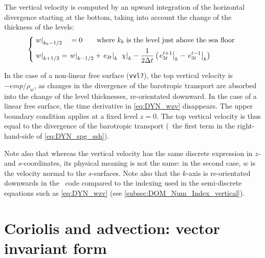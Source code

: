 \documentclass[../main/NEMO_manual]{subfiles}
\begin{document}
The vertical velocity is computed by an upward integration of the horizontal divergence starting at the bottom,
taking into account the change of the thickness of the levels:
\begin{equation}
  \label{eq:DYN_wzv}
  \left\{
    \begin{aligned}
      &\left. w \right|_{k_b-1/2} \quad= 0    \qquad \text{where } k_b \text{ is the level just above the sea floor }  	\\
      &\left. w \right|_{k+1/2}     = \left. w \right|_{k-1/2}  +  \left. e_{3t} \right|_{k}\;  \left. \chi \right|_k
      - \frac{1} {2 \Delta t} \left(  \left. e_{3t}^{t+1}\right|_{k} - \left. e_{3t}^{t-1}\right|_{k}\right)
    \end{aligned}
  \right.
\end{equation}

In the case of a non-linear free surface (\texttt{vvl?}), the top vertical velocity is $-\textit{emp}/\rho_w$,
as changes in the divergence of the barotropic transport are absorbed into the change of the level thicknesses,
re-orientated downward.
In the case of a linear free surface, the time derivative in \autoref{eq:DYN_wzv} disappears.
The upper boundary condition applies at a fixed level $z=0$.
The top vertical velocity is thus equal to the divergence of the barotropic transport
(\ie\ the first term in the right-hand-side of \autoref{eq:DYN_spg_ssh}).

Note also that whereas the vertical velocity has the same discrete expression in $z$- and $s$-coordinates,
its physical meaning is not the same:
in the second case, $w$ is the velocity normal to the $s$-surfaces.
Note also that the $k$-axis is re-orientated downwards in the \fortran\ code compared to
the indexing used in the semi-discrete equations such as \autoref{eq:DYN_wzv}
(see \autoref{subsec:DOM_Num_Index_vertical}).

\section{Coriolis and advection: vector invariant form}
\label{sec:DYN_adv_cor_vect}

\begin{listing}
  \caption{}
  \label{lst:namdyn_adv}
\end{listing}
\end{document}
